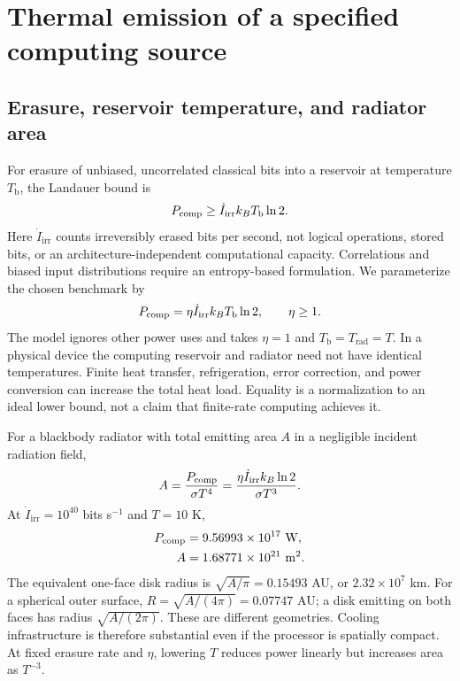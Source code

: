 \documentclass[10pt,twocolumn]{article}
\newcommand{\Iirr}{\dot I_{\mathrm{irr}}}
\newcommand{\Trad}{T_{\mathrm{rad}}}
\newcommand{\Tb}{T_{\mathrm{b}}}
\begin{document}
\section{Thermal emission of a specified computing source}
\subsection{Erasure, reservoir temperature, and radiator area}
For erasure of unbiased, uncorrelated classical bits into a reservoir at
temperature $\Tb$, the Landauer bound is
\cite{Landauer1961,Bennett1973}
\begin{equation}
P_{\rm comp}\geq\Iirr k_B\Tb\ln2.
\end{equation}
Here $\Iirr$ counts irreversibly erased bits per second, not logical
operations, stored bits, or an architecture-independent computational
capacity. Correlations and biased input distributions require an
entropy-based formulation. We parameterize the chosen benchmark by
\begin{equation}
P_{\rm comp}=\eta\Iirr k_B\Tb\ln2,\qquad\eta\geq1.
\end{equation}
The model ignores other power uses and takes $\eta=1$ and
$\Tb=\Trad=T$. In a physical device the computing reservoir and
radiator need not have identical temperatures. Finite heat transfer,
refrigeration, error correction, and power conversion can increase the
total heat load. Equality is a normalization to an ideal lower bound,
not a claim that finite-rate computing achieves it.

For a blackbody radiator with total emitting area $A$ in a negligible
incident radiation field,
\begin{equation}
A=\frac{P_{\rm comp}}{\sigma T^4}
 =\frac{\eta\Iirr k_B\ln2}{\sigma T^3}.
\label{eq:area}
\end{equation}
At $\Iirr=10^{40}$ bits s$^{-1}$ and $T=10$ K,
\begin{align}
P_{\rm comp}&=9.56993\times10^{17}\ {\rm W},\\
A&=1.68771\times10^{21}\ {\rm m^2}.
\end{align}
The equivalent one-face disk radius is $\sqrt{A/\pi}=0.15493$ AU,
or $2.32\times10^7$ km. For a spherical outer surface,
$R=\sqrt{A/(4\pi)}=0.07747$ AU; a disk emitting on both faces has
radius $\sqrt{A/(2\pi)}$. These are different geometries.
Cooling infrastructure is therefore substantial even if the processor
is spatially compact. At fixed erasure rate and $\eta$, lowering $T$
reduces power linearly but increases area as $T^{-3}$.
\end{document}

